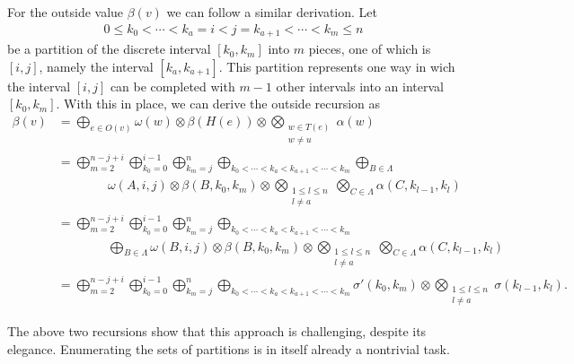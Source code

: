     For the outside value $\beta(v)$ we can follow a similar derivation. Let
    \begin{align*}
      0 \leq k_0 < \cdots < k_a = i < j = k_{a+1} < \cdots < k_m \leq n
    \end{align*}
    be a partition of the discrete interval $[k_0, k_m]$ into $m$ pieces, one of which is $[i, j]$, namely the interval $[k_a, k_{a+1}]$. This partition represents one way in wich the interval $[i, j]$ can be completed with $m-1$ other intervals into an interval $[k_0, k_m]$. With this in place, we can derive the outside recursion as
    \begin{align*}
      \beta(v)
        &= \displaystyle\bigoplus_{e \in O(v)} \omega(w) \otimes \beta(H(e)) \otimes \displaystyle\bigotimes_{ \substack{ w \in T(e) \\ w \neq u } } \alpha(w) \\
        &= \displaystyle\bigoplus_{m = 2}^{n - j + i} \displaystyle\bigoplus_{k_0=0}^{i-1} \displaystyle\bigoplus_{k_m = j}^{n} \displaystyle\bigoplus_{k_0 < \cdots < k_a < k_{a+1} < \cdots < k_m} \displaystyle\bigoplus_{B \in \Lambda}  \\
          &\qquad\qquad \omega(A, i, j) \otimes \beta(B, k_0, k_m) \otimes \displaystyle\bigotimes_{ \substack{1 \leq l \leq n \\ l \neq a } } \displaystyle\bigotimes_{C \in \Lambda} \alpha(C, k_{l-1}, k_l) \\
        &= \displaystyle\bigoplus_{m = 2}^{n - j + i} \displaystyle\bigoplus_{k_0=0}^{i-1} \displaystyle\bigoplus_{k_m = j}^{n} \displaystyle\bigoplus_{k_0 < \cdots < k_a < k_{a+1} < \cdots < k_m}  \\
          &\qquad\qquad \displaystyle\bigoplus_{B \in \Lambda} \omega(B, i, j) \otimes \beta(B, k_0, k_m) \otimes \displaystyle\bigotimes_{ \substack{1 \leq l \leq n \\ l \neq a } } \displaystyle\bigotimes_{C \in \Lambda} \alpha(C, k_{l-1}, k_l)  \\
        &= \displaystyle\bigoplus_{m = 2}^{n - j + i} \displaystyle\bigoplus_{k_0=0}^{i-1} \displaystyle\bigoplus_{k_m = j}^{n} \displaystyle\bigoplus_{k_0 < \cdots < k_a < k_{a+1} < \cdots < k_m} \sigma'(k_0, k_m) \otimes \displaystyle\bigotimes_{ \substack{1 \leq l \leq n \\ l \neq a } } \sigma(k_{l-1}, k_l).
    \end{align*}

    The above two recursions show that this approach is challenging, despite its elegance. Enumerating the sets of partitions is in itself already a nontrivial task.


